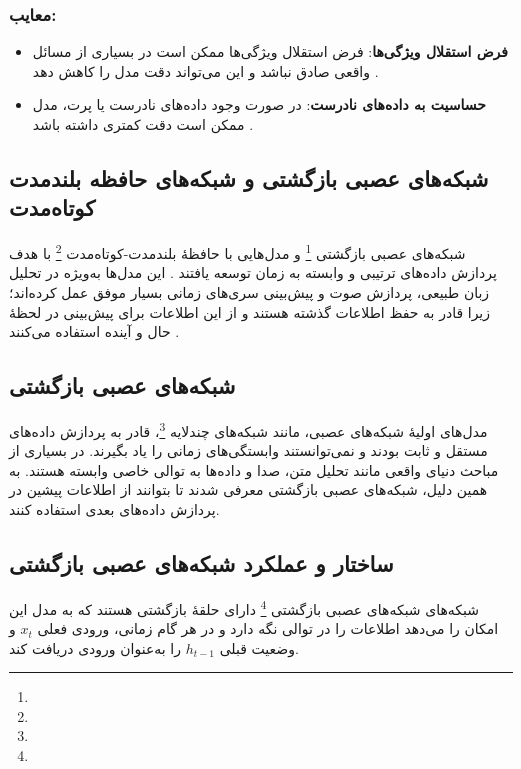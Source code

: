 \subsubsection{معایب:}
\begin{itemize}
	\item \textbf{فرض استقلال ویژگی‌ها}: فرض استقلال ویژگی‌ها ممکن است در بسیاری از مسائل واقعی صادق نباشد و این می‌تواند دقت مدل را کاهش دهد
	\cite{domingos1997optimal}.
	\item \textbf{حساسیت به داده‌های نادرست}: در صورت وجود داده‌های نادرست یا پرت، مدل ممکن است دقت کمتری داشته باشد
	\cite{bishop2006pattern}.
\end{itemize}


\subsection{شبکه‌های عصبی بازگشتی و شبکه‌های حافظه بلندمدت کوتاه‌مدت}
شبکه‌های عصبی بازگشتی \footnote{} و مدل‌هایی با حافظهٔ بلندمدت-کوتاه‌مدت \footnote{} با هدف پردازش داده‌های ترتیبی و وابسته به زمان توسعه یافتند
\cite{rumelhart1986learning,hochreiter1997long}.
این مدل‌ها به‌ویژه در تحلیل زبان طبیعی، پردازش صوت و پیش‌بینی سری‌های زمانی بسیار موفق عمل کرده‌اند؛ زیرا قادر به حفظ اطلاعات گذشته هستند و از این اطلاعات برای پیش‌بینی در لحظهٔ حال و آینده استفاده می‌کنند
\cite{gers1999learning}.

\subsection{شبکه‌های عصبی بازگشتی}
مدل‌های اولیهٔ شبکه‌های عصبی، مانند شبکه‌های چندلایه \footnote{}، قادر به پردازش داده‌های مستقل و ثابت بودند و نمی‌توانستند وابستگی‌های زمانی را یاد بگیرند\cite{bishop2006pattern}.
در بسیاری از مباحث دنیای واقعی مانند تحلیل متن، صدا و  داده‌ها به توالی خاصی وابسته هستند. به همین دلیل، شبکه‌های عصبی بازگشتی معرفی شدند تا بتوانند از اطلاعات پیشین در پردازش داده‌های بعدی استفاده کنند\cite{rumelhart1986learning}.


\subsection{ساختار و عملکرد شبکه‌های عصبی بازگشتی}
شبکه‌های شبکه‌های عصبی بازگشتی \footnote{} دارای حلقهٔ بازگشتی هستند که به مدل این امکان را می‌دهد اطلاعات را در توالی نگه دارد و در هر گام زمانی، ورودی فعلی \( x_t \) و وضعیت قبلی \( h_{t-1} \) را به‌عنوان ورودی دریافت کند\cite{goodfellow2016deep}.




